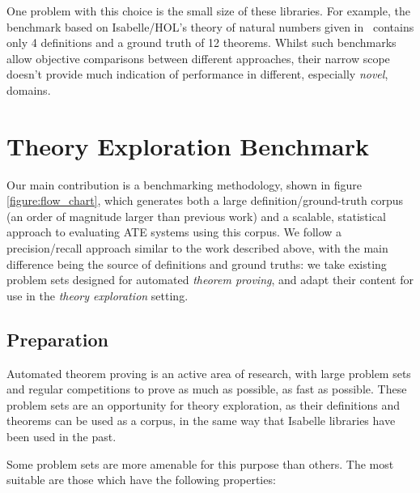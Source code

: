 One problem with this choice is the small size of these libraries. For example,
the benchmark based on Isabelle/HOL's theory of natural numbers given
in~\cite{Johansson.Dixon.Bundy:conjecture-generation} contains only 4
definitions and a ground truth of 12 theorems. Whilst such benchmarks allow
objective comparisons between different approaches, their narrow scope doesn't
provide much indication of performance in different, especially \emph{novel},
domains.

\section{Theory Exploration Benchmark}
\label{sec:proposal}

Our main contribution is a benchmarking methodology, shown in figure
\ref{figure:flow_chart}, which generates both a large definition/ground-truth
corpus (an order of magnitude larger than previous work) and a scalable,
statistical approach to evaluating ATE systems using this corpus. We follow a
precision/recall approach similar to the work described above, with the main
difference being the source of definitions and ground truths: we take existing
problem sets designed for automated \emph{theorem proving}, and adapt their
content for use in the \emph{theory exploration} setting.

\subsection{Preparation}
\label{section:prep}

Automated theorem proving is an active area of research, with large problem sets
and regular competitions to prove as much as possible, as fast as
possible\cite{pelletier2002development}. These problem sets are an opportunity
for theory exploration, as their definitions and theorems can be used as a
corpus, in the same way that Isabelle libraries have been used in the past.

Some problem sets are more amenable for this purpose than others. The most
suitable are those which have the following properties:


